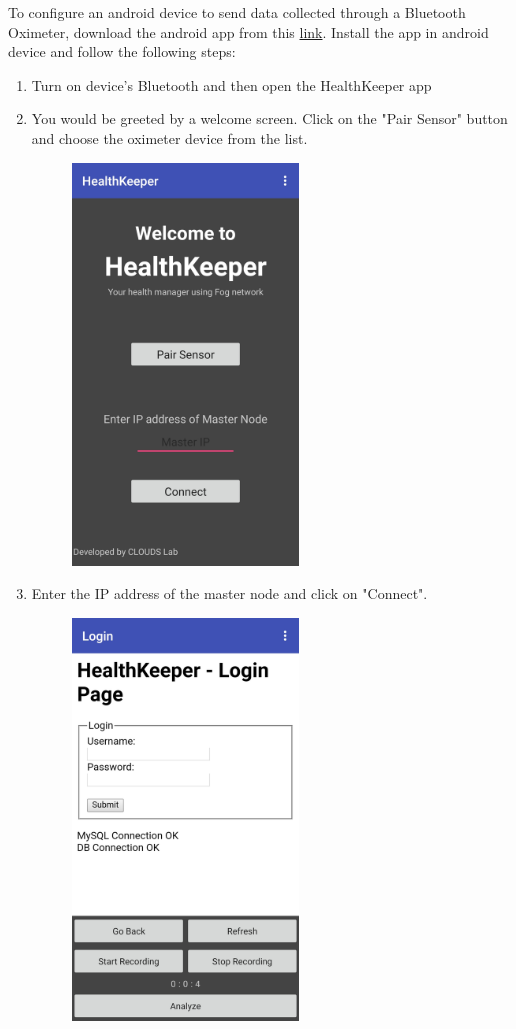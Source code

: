 \documentclass{article}
\begin{document}
To configure an android device to send data collected through a Bluetooth Oximeter, download the android app from this \href{https://drive.google.com/open?id=1Nh6qBr_IfAy8te00TimrC3SWVt_SmIMz}{link}. Install the app in android device and follow the following steps:
\begin{enumerate}
\item Turn on device's Bluetooth and then open the HealthKeeper app
\item You would be greeted by a welcome screen. Click on the "Pair Sensor" button and choose the oximeter device from the list.
\begin{figure}[h]
\centering
\includegraphics[width=6cm]{welcome}
\end{figure}
\item Enter the IP address of the master node and click on "Connect".
\newpage
\begin{figure}[h]
\centering
\includegraphics[width=6cm]{login}

\end{figure}
\end{enumerate}
\end{document}
